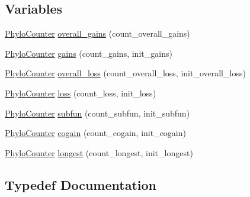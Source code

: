 \subsection*{Variables}
\begin{DoxyCompactItemize}
\item 
\hyperlink{namespacebarry_1_1counters_1_1phylo_aa4a36956c99f63ed02b7068a495bb56a}{Phylo\+Counter} \hyperlink{namespacebarry_1_1counters_1_1phylo_afb7d5e1d4a7457c6d2c794239407dcdb}{overall\+\_\+gains} (count\+\_\+overall\+\_\+gains)
\item 
\hyperlink{namespacebarry_1_1counters_1_1phylo_aa4a36956c99f63ed02b7068a495bb56a}{Phylo\+Counter} \hyperlink{namespacebarry_1_1counters_1_1phylo_adb9fd1ed2c6af82bd0deecebe5e41c0d}{gains} (count\+\_\+gains, init\+\_\+gains)
\item 
\hyperlink{namespacebarry_1_1counters_1_1phylo_aa4a36956c99f63ed02b7068a495bb56a}{Phylo\+Counter} \hyperlink{namespacebarry_1_1counters_1_1phylo_ac9c47e5228507fb455f894f2a0978314}{overall\+\_\+loss} (count\+\_\+overall\+\_\+loss, init\+\_\+overall\+\_\+loss)
\item 
\hyperlink{namespacebarry_1_1counters_1_1phylo_aa4a36956c99f63ed02b7068a495bb56a}{Phylo\+Counter} \hyperlink{namespacebarry_1_1counters_1_1phylo_a12cebdc97bb77ae2bb660fc48640596f}{loss} (count\+\_\+loss, init\+\_\+loss)
\item 
\hyperlink{namespacebarry_1_1counters_1_1phylo_aa4a36956c99f63ed02b7068a495bb56a}{Phylo\+Counter} \hyperlink{namespacebarry_1_1counters_1_1phylo_aee78851723795b1d8ba773b3c3c58afc}{subfun} (count\+\_\+subfun, init\+\_\+subfun)
\item 
\hyperlink{namespacebarry_1_1counters_1_1phylo_aa4a36956c99f63ed02b7068a495bb56a}{Phylo\+Counter} \hyperlink{namespacebarry_1_1counters_1_1phylo_aaab2fdcc1114bc778e319afebc8cd90f}{cogain} (count\+\_\+cogain, init\+\_\+cogain)
\item 
\hyperlink{namespacebarry_1_1counters_1_1phylo_aa4a36956c99f63ed02b7068a495bb56a}{Phylo\+Counter} \hyperlink{namespacebarry_1_1counters_1_1phylo_a558ab73b56530347c45f8a3f2481f74d}{longest} (count\+\_\+longest, init\+\_\+longest)
\end{DoxyCompactItemize}


\subsection{Typedef Documentation}
\mbox{\label{namespacebarry_1_1counters_1_1phylo_a50a6652c16ff57d76b4099043d6a0bbb}} 
